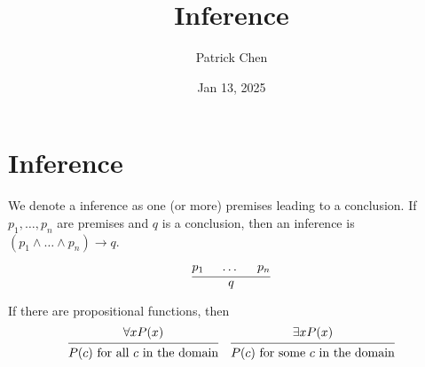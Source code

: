 \documentclass{article}
\title{Inference}
\author{Patrick Chen}
\date{Jan 13, 2025}
\theoremstyle{mytheoremstyle}
\theoremstyle{mytheoremstyle}
\theoremstyle{myproblemstyle}
\begin{document}
    \maketitle
    \section*{Inference}
    We denote a inference as one (or more) premises leading to a conclusion. If
    $p_1,\dots,p_n$ are premises and $q$ is a conclusion, then an inference is
    $(p_1 \wedge \dots \wedge p_n) \rightarrow q$.

    \[
        \begin{prooftree}
            \hypo{p_1}
            \hypo{\dots}
            \hypo{p_n}
            \infer3{q}
        \end{prooftree}
    \]

    If there are propositional functions, then 
    \[
        \begin{prooftree}
            \hypo{\forall x P(x)}
            \infer1{P(c) \text{ for all $c$ in the domain}}
        \end{prooftree}
        \quad
        \begin{prooftree}
            \hypo{\exists x P(x)}
            \infer1{P(c) \text{ for some $c$ in the domain}}
        \end{prooftree}
    \]
\end{document}
